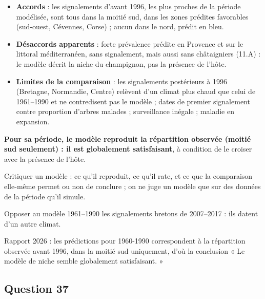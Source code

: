 \documentclass[11pt,a4paper]{article}
\providecommand{\tightlist}{\setlength{\itemsep}{0pt}\setlength{\parskip}{0pt}}
\begin{document}
\begin{itemize}
\tightlist
\item
  \textbf{Accords} : les signalements d'avant 1996, les plus proches de la période modélisée, sont tous dans la moitié sud, dans les zones prédites favorables (sud-ouest, Cévennes, Corse) ; aucun dans le nord, prédit en bleu.
\item
  \textbf{Désaccords apparents} : forte prévalence prédite en Provence et sur le littoral méditerranéen, sans signalement, mais aussi sans châtaigniers (11.A) : le modèle décrit la niche du champignon, pas la présence de l'hôte.
\item
  \textbf{Limites de la comparaison} : les signalements postérieurs à 1996 (Bretagne, Normandie, Centre) relèvent d'un climat plus chaud que celui de 1961--1990 et ne contredisent pas le modèle ; dates de premier signalement contre proportion d'arbres malades ; surveillance inégale ; maladie en expansion.
\end{itemize}

\textbf{Pour sa période, le modèle reproduit la répartition observée (moitié sud seulement) : il est globalement satisfaisant}, à condition de le croiser avec la présence de l'hôte.

\begin{methode}

Critiquer un modèle : ce qu'il reproduit, ce qu'il rate, et ce que la comparaison elle-même permet ou non de conclure ; on ne juge un modèle que sur des données de la période qu'il simule.

\end{methode}

\begin{piege}

Opposer au modèle 1961--1990 les signalements bretons de 2007--2017 : ils datent d'un autre climat.

\end{piege}

\begin{jury}

Rapport 2026 : les prédictions pour 1960-1990 correspondent à la répartition observée avant 1996, dans la moitié sud uniquement, d'où la conclusion « Le modèle de niche semble globalement satisfaisant. »

\end{jury}

\hypertarget{question-37}{%
\subsection{Question 37}\label{question-37}}
\end{document}
